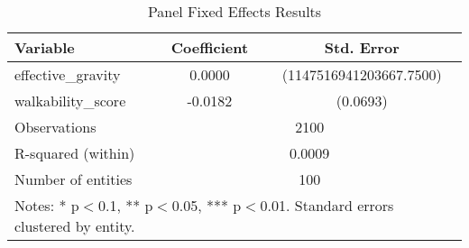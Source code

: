 \begin{table}[htbp]
\centering
\caption{Panel Fixed Effects Results}
\begin{tabular}{lcc}
\hline
Variable & Coefficient & Std. Error \\
\hline
effective_gravity & 0.0000 & (1147516941203667.7500) \\
walkability_score & -0.0182 & (0.0693) \\
\hline
Observations & \multicolumn{2}{c}{2100} \\
R-squared (within) & \multicolumn{2}{c}{0.0009} \\
Number of entities & \multicolumn{2}{c}{100} \\
\hline
\multicolumn{3}{p{0.75\textwidth}}{\footnotesize Notes: * p$<$0.1, ** p$<$0.05, *** p$<$0.01. Standard errors clustered by entity.} \\
\end{tabular}
\end{table}
